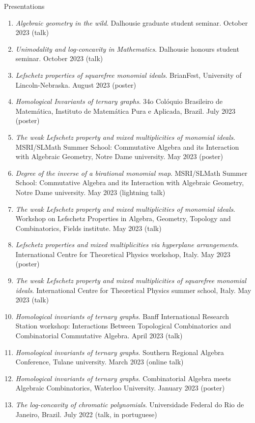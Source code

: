 \documentclass[12pt]{resume} %
\begin{document}
\begin{rSection}{Presentations}
\begin{enumerate}
        \item \textit{Algebraic geometry in the wild}. Dalhousie graduate student seminar. October 2023 (talk)
        \item \textit{Unimodality and log-concavity in Mathematics}. Dalhousie honours student seminar. October 2023 (talk)
        \item \textit{Lefschetz properties of squarefree monomial ideals}. BrianFest, University of Lincoln-Nebraska. August 2023 (poster)
        \item \textit{Homological Invariants of ternary graphs}. 34o Colóquio Brasileiro de Matemática, Instituto de Matemática Pura e Aplicada, Brazil. July 2023 (poster)
        \item \textit{The weak Lefschetz property and mixed multiplicities of monomial ideals}. MSRI/SLMath Summer School: Commutative Algebra and its Interaction with Algebraic Geometry, Notre Dame university. May 2023 (poster)
        \item \textit{Degree of the inverse of a birational monomial map}. MSRI/SLMath Summer School: Commutative Algebra and its Interaction with Algebraic Geometry, Notre Dame university. May 2023 (lightning talk)
        \item \textit{The weak Lefschetz property and mixed multiplicities of monomial ideals}. Workshop on Lefschetz Properties in Algebra, Geometry, Topology and Combinatorics, Fields institute. May 2023 (talk)
        \item \textit{Lefschetz properties and mixed multiplicities via hyperplane arrangements}. International Centre for Theoretical Physics workshop, Italy. May 2023 (poster)
        \item \textit{The weak Lefschetz property and mixed multiplicities of squarefree monomial ideals}. International Centre for Theoretical Physics summer school, Italy. May 2023 (talk)
        \item \textit{Homological invariants of ternary graphs}. Banff International Research Station workshop: Interactions Between Topological Combinatorics and Combinatorial Commutative Algebra. April 2023 (talk)
        \item \textit{Homological invariants of ternary graphs}. Southern Regional Algebra Conference, Tulane university. March 2023 (online talk)
        \item \textit{Homological invariants of ternary graphs}. Combinatorial Algebra meets Algebraic Combinatorics, Waterloo University. January 2023 (poster)
        \item \textit{The log-concavity of chromatic polynomials}. Universidade Federal do Rio de Janeiro, Brazil. July 2022 (talk, in portuguese)

\end{enumerate}
\end{rSection}
\end{document}
